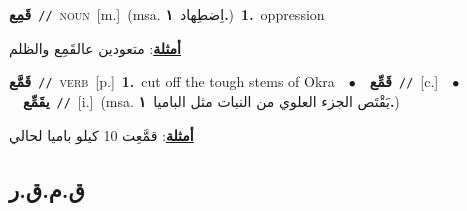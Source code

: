 \documentclass[10pt,a4paper,twoside]{article} %
\begin{document}
\begin{multicols}{2}
{\setlength\topsep{0pt}\textbf{\foreignlanguage{arabic}{قَمِع}}\ {\color{gray}\texttt{//}\color{black}}\ \textsc{noun}\ [m.]\ \color{gray}(msa. \foreignlanguage{arabic}{اِضطِهاد}~\foreignlanguage{arabic}{\textbf{١.}})\color{black}\ \textbf{1.}~oppression\  \begin{flushright}\color{gray}\foreignlanguage{arabic}{\textbf{\underline{\foreignlanguage{arabic}{أمثلة}}}: متعودين عالقَمِع والظلم}\end{flushright}\color{black}} \vspace{2mm}

{\setlength\topsep{0pt}\textbf{\foreignlanguage{arabic}{قَمَّع}}\ {\color{gray}\texttt{//}\color{black}}\ \textsc{verb}\ [p.]\ \textbf{1.}~cut off the tough stems of Okra\ \ $\bullet$\ \ \setlength\topsep{0pt}\textbf{\foreignlanguage{arabic}{قَمِّع}}\ {\color{gray}\texttt{//}\color{black}}\ [c.]\ \ $\bullet$\ \ \setlength\topsep{0pt}\textbf{\foreignlanguage{arabic}{يقَمِّع}}\ {\color{gray}\texttt{//}\color{black}}\ [i.]\ \color{gray}(msa. \foreignlanguage{arabic}{يَقْتَص الجزء العلوي من النبات مثل الباميا}~\foreignlanguage{arabic}{\textbf{١.}})\color{black}\  \begin{flushright}\color{gray}\foreignlanguage{arabic}{\textbf{\underline{\foreignlanguage{arabic}{أمثلة}}}: قمَّعِت 10 كيلو باميا لحالي}\end{flushright}\color{black}} \vspace{2mm}

\vspace{-3mm}
\subsection*{\color{blue}\foreignlanguage{arabic}{ق.م.ق.ر}\color{blue}{}} 


\end{multicols}
\end{document}

